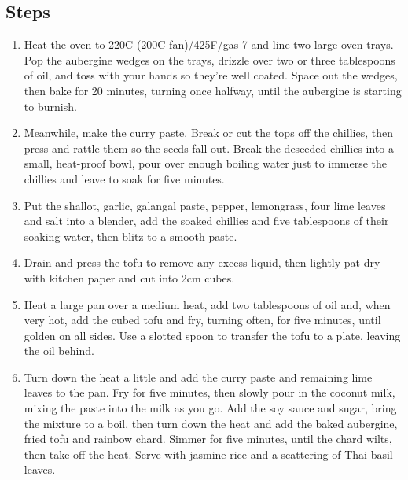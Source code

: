 \documentclass{book}
\begin{document}
\subsection*{Steps}
\begin{enumerate}
\item Heat the oven to 220C (200C fan)/425F/gas 7 and line two large oven trays. Pop the aubergine wedges on the trays, drizzle over two or three tablespoons of oil, and toss with your hands so they’re well coated. Space out the wedges, then bake for 20 minutes, turning once halfway, until the aubergine is starting to burnish.
\item Meanwhile, make the curry paste. Break or cut the tops off the chillies, then press and rattle them so the seeds fall out. Break the deseeded chillies into a small, heat-proof bowl, pour over enough boiling water just to immerse the chillies and leave to soak for five minutes.
\item Put the shallot, garlic, galangal paste, pepper, lemongrass, four lime leaves and salt into a blender, add the soaked chillies and five tablespoons of their soaking water, then blitz to a smooth paste.
\item Drain and press the tofu to remove any excess liquid, then lightly pat dry with kitchen paper and cut into 2cm cubes.
\item Heat a large pan over a medium heat, add two tablespoons of oil and, when very hot, add the cubed tofu and fry, turning often, for five minutes, until golden on all sides. Use a slotted spoon to transfer the tofu to a plate, leaving the oil behind.
\item Turn down the heat a little and add the curry paste and remaining lime leaves to the pan. Fry for five minutes, then slowly pour in the coconut milk, mixing the paste into the milk as you go. Add the soy sauce and sugar, bring the mixture to a boil, then turn down the heat and add the baked aubergine, fried tofu and rainbow chard. Simmer for five minutes, until the chard wilts, then take off the heat. Serve with jasmine rice and a scattering of Thai basil leaves.
\end{enumerate}
\newpage
\end{document}
